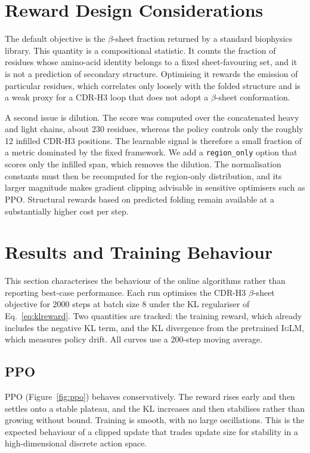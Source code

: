 \documentclass[11pt]{article}
\newcommand{\iglm}{\textsc{IgLM}}
\begin{document}
\section{Reward Design Considerations}
The default objective is the $\beta$-sheet fraction returned by a standard
biophysics library. This quantity is a compositional statistic. It counts the
fraction of residues whose amino-acid identity belongs to a fixed sheet-favouring
set, and it is not a prediction of secondary structure. Optimising it rewards the
emission of particular residues, which correlates only loosely with the folded
structure and is a weak proxy for a CDR-H3 loop that does not adopt a $\beta$-sheet
conformation.

A second issue is dilution. The score was computed over the concatenated heavy and
light chains, about 230 residues, whereas the policy controls only the roughly 12
infilled CDR-H3 positions. The learnable signal is therefore a small fraction of a
metric dominated by the fixed framework. We add a \texttt{region\_only} option that
scores only the infilled span, which removes the dilution. The normalisation
constants must then be recomputed for the region-only distribution, and its larger
magnitude makes gradient clipping advisable in sensitive optimisers such as PPO.
Structural rewards based on predicted folding remain available at a substantially
higher cost per step.

\section{Results and Training Behaviour}
This section characterises the behaviour of the online algorithms rather than
reporting best-case performance. Each run optimises the CDR-H3 $\beta$-sheet
objective for 2000 steps at batch size 8 under the KL regulariser of
Eq.~\ref{eq:klreward}. Two quantities are tracked: the training reward, which
already includes the negative KL term, and the KL divergence from the pretrained
\iglm{}, which measures policy drift. All curves use a 200-step moving average.

\subsection{PPO}
PPO (Figure~\ref{fig:ppo}) behaves conservatively. The reward rises early and then
settles onto a stable plateau, and the KL increases and then stabilises rather than
growing without bound. Training is smooth, with no large oscillations. This is the
expected behaviour of a clipped update that trades update size for stability in a
high-dimensional discrete action space.
\end{document}
